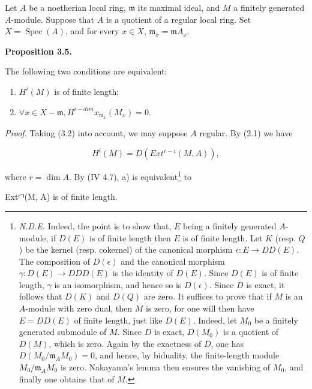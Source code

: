 \documentclass[
]{article}
\newenvironment{Shaded}{}{}
\newcommand{\NormalTok}[1]{#1}
\begin{document}
Let \(A\) be a noetherian local ring, \(\mathfrak{m}\) its maximal
ideal, and \(M\) a finitely generated \(A\)-module. Suppose that \(A\)
is a quotient of a regular local ring. Set
\(X = \operatorname{Spec}(A)\), and for every \(x \in X\),
\(\mathfrak{m}_{x} = \mathfrak{m}A_{x}\).

\textbf{Proposition 3.5.}

The following two conditions are equivalent:

\begin{enumerate}
\def\labelenumi{\alph{enumi})}
\item
  \(H^{i}(M)\) is of finite length;
\item
  \(\forall x \in X - {\mathfrak{m}}, H^{i-dim} {x}_{\mathfrak{m}_{x}}(M_{x}) = 0\).
\end{enumerate}

\emph{Proof.} Taking (3.2) into account, we may suppose \(A\) regular.
By (2.1) we have

\[
H^{i}(M) = D(Ext^{r-i}(M, A)),
\]

where \(r = \dim A\). By (IV 4.7), a) is equivalent\footnote{\emph{N.D.E.}
  Indeed, the point is to show that, \(E\) being a finitely generated
  \(A\)-module, if \(D(E)\) is of finite length then \(E\) is of finite
  length. Let \(K\) (resp. \(Q\)) be the kernel (resp. cokernel) of the
  canonical morphism \(\epsilon: E \to DD(E)\). The composition of
  \(D(\epsilon)\) and the canonical morphism \(\gamma: D(E) \to DDD(E)\)
  is the identity of \(D(E)\). Since \(D(E)\) is of finite length,
  \(\gamma\) is an isomorphism, and hence so is \(D(\epsilon)\). Since
  \(D\) is exact, it follows that \(D(K)\) and \(D(Q)\) are zero. It
  suffices to prove that if \(M\) is an \(A\)-module with zero dual,
  then \(M\) is zero, for one will then have \(E = DD(E)\) of finite
  length, just like \(D(E)\). Indeed, let \(M_{0}\) be a finitely
  generated submodule of \(M\). Since \(D\) is exact, \(D(M_{0})\) is a
  quotient of \(D(M)\), which is zero. Again by the exactness of \(D\),
  one has \(D(M_{0}/\mathfrak{m}_{A} M_{0}) = 0\), and hence, by
  biduality, the finite-length module \(M_{0}/\mathfrak{m}_{A} M_{0}\)
  is zero. Nakayama's lemma then ensures the vanishing of \(M_{0}\), and
  finally one obtains that of \(M\).} to

\begin{Shaded}
\begin{Highlighting}[]
\NormalTok{Extʳ⁻ⁱ(M, A) is of finite length.}
\end{Highlighting}
\end{Shaded}
\end{document}
